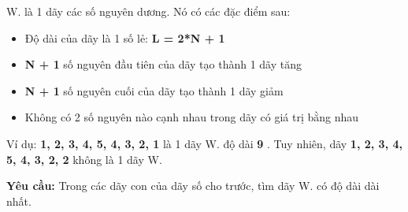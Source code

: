 W. là 1 dãy các số nguyên dương. Nó có các đặc điểm sau:
\begin{itemize}
	\item Độ dài của dãy là 1 số lẻ: \textbf{ L = 2*N + 1 }
	\item \textbf{N + 1 } số nguyên đầu tiên của dãy tạo thành 1 dãy tăng
	\item \textbf{N + 1 } số nguyên cuối của dãy tạo thành 1 dãy giảm
	\item Không có 2 số nguyên nào cạnh nhau trong dãy có giá trị bằng nhau
\end{itemize}

Ví dụ: \textbf{ 1, 2, 3, 4, 5, 4, 3, 2, 1 } là 1 dãy W. độ dài \textbf{ 9 } . Tuy nhiên, dãy \textbf{ 1, 2, 3, 4, 5, 4, 3, 2, 2 } không là 1 dãy W.

\textbf{Yêu cầu: } Trong các dãy con của dãy số cho trước, tìm dãy W. có độ dài dài nhất.